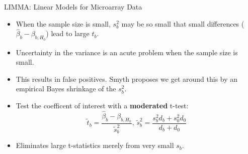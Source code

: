 \documentclass[12pt,t,handout]{beamer}
\begin{document}
\begin{frame}[c]{LIMMA: Linear Models for Microarray Data}

\begin{center}
\begin{itemize}
  \itemsep12pt
  \item When the sample size is small, $s^2_b$ may be so small that small
    differences ($\hat{\beta}_{b} - \beta_{b, H_0}$) lead to large $t_{b}$.
  \item Uncertainty in the variance is an acute problem when the sample size is
    small.
  \item This results in false positives. Smyth proposes we get around this by an
    empirical Bayes shrinkage of the $s^2_b$.
  \item Test the coefficent of interest with a \textbf{moderated} t-test:
    \[
      \tilde{t}_{b} = \frac{\hat{\beta}_{b} - \beta_{b, H_0}}{\tilde{s}^2_b},
      \,
      \tilde{s}^2_b = \frac{s^2_bd_b + s^2_0d_0}{d_b + d_0}
    \]
  \item Eliminates large t-statistics merely from very small $s_b$.
\end{itemize}
\end{center}

\end{frame}
\end{document}
